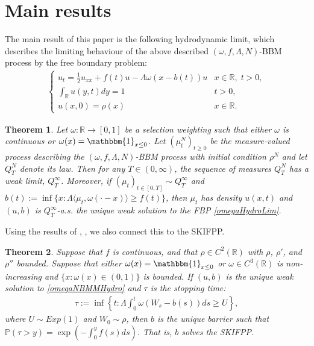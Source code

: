 \documentclass[10pt,a4paper]{amsart}
\newtheorem{theorem}{Theorem}
\newcommand{\B}[1]{\mathbb{#1}}
\newcommand{\is}{\mathbbm{1}}
\begin{document}
\section{Main results}

The main result of this paper is the following hydrodynamic limit, which describes the limiting behaviour of the above described $(\omega,f,\Lambda,N)$-BBM process by the free boundary problem:
\begin{align} \label{omegaNBMMHydro}
    \begin{cases}
        u_t = \frac12 u_{xx} + f(t)u - \Lambda\omega(x-b(t))u & x\in \B{R},\;t>0,\\
        \int_\B{R} u(y,t)dy = 1 & t>0,\\
        u(x,0)=\rho(x) & x\in \B{R}.
    \end{cases}
    \end{align}

\begin{theorem} \label{1stMainThemOmega}
    Let $\omega:\B{R}\to[0,1]$ be a selection weighting such that either $\omega$ is continuous or $\omega(x)=\is_{x\leq 0}$. Let $(\mu_t^N)_{t\geq 0}$ be the measure-valued process describing the $(\omega,f,\Lambda,N)$-BBM process with initial condition $\rho^N$ and let $Q_T^N$ denote its law. Then for any $T\in (0,\infty)$, the sequence of measures $Q_T^N$ has a weak limit, $Q_T^\infty$. Moreover, if $(\mu_t)_{t\in [0,T]}\sim Q_T^\infty$ and $b(t):=\inf\{x:\Lambda\langle \mu_t,\omega(\cdot-x)\rangle \geq f(t)\}$, then $\mu_t$ has density $u(x,t)$ and $(u,b)$ is $Q_T^\infty$-a.s. the unique weak solution to the FBP \eqref{omegaHydroLim}.
\end{theorem}

Using the results of \cite{ettingerHeningEvans}, \cite{ettingerHeningKwong}, we also connect this to the SKIFPP. 


\begin{theorem} \label{2ndMainThemOmega}
    Suppose that $f$ is continuous, and that $\rho\in C^2(\B{R})$ with $\rho$, $\rho'$, and $\rho''$ bounded. Suppose that either $\omega(x)=\is_{x\leq 0}$ or $\omega\in C^3(\B{R})$ is non-increasing and $\{x:\omega(x)\in (0,1)\}$ is bounded. If $(u,b)$ is the unique weak solution to \eqref{omegaNBMMHydro} and $\tau$ is the stopping time:
    \begin{align*}
        \tau:=\inf\left\{t:\Lambda\int_0^t \omega(W_s-b(s))ds\geq U\right\},
    \end{align*}
    where $U\sim Exp(1)$ and $W_0\sim \rho$, then $b$ is the unique barrier such that $\B{P}(\tau>y)=\exp(-\int_0^y f(s)ds)$. That is, $b$ solves the SKIFPP. 
\end{theorem}
\end{document}
